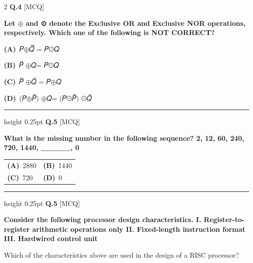 \documentclass[a4paper,10pt,twoside]{article}
\begin{document}
\begin{multicols}{2}
\noindent\textbf{Q.4} \hfill {\footnotesize\textsf{[MCQ]}}
\par\vspace{2pt}
{\bfseries Let $\oplus$ and ⊙ denote the Exclusive OR and Exclusive NOR operations, respectively.
Which one of the following is NOT CORRECT? \par}
\par\vspace{2pt}\noindent
\textbf{(A)}~𝑃$\oplus$𝑄̅̅̅̅̅̅̅̅ = 𝑃⊙𝑄\par\vspace{2pt}\noindent
\textbf{(B)}~𝑃̅ $\oplus$𝑄= 𝑃⊙𝑄\par\vspace{2pt}\noindent
\textbf{(C)}~𝑃̅ $\oplus$𝑄̅ = 𝑃$\oplus$𝑄\par\vspace{2pt}\noindent
\textbf{(D)}~(𝑃$\oplus$𝑃̅) $\oplus$𝑄= (𝑃⊙𝑃̅) ⊙𝑄̅
\par\vspace{6pt}\hrule height 0.25pt\vspace{6pt}
\noindent\textbf{Q.5} \hfill {\footnotesize\textsf{[MCQ]}}
\par\vspace{2pt}
{\bfseries What is the missing number in the following sequence?
2, 12, 60, 240, 720, 1440, \_\_\_\_\_, 0 \par}
\par\vspace{2pt}\noindent
\begin{tabular*}{\columnwidth}{@{\extracolsep{\fill}}p{}p{}@{}}
\textbf{(A)}~2880 & \textbf{(B)}~1440 \\
\addlinespace[2pt]
\textbf{(C)}~720 & \textbf{(D)}~0
\end{tabular*}
\par\vspace{6pt}\hrule height 0.25pt\vspace{6pt}
\noindent\textbf{Q.5} \hfill {\footnotesize\textsf{[MCQ]}}
\par\vspace{2pt}
{\bfseries Consider the following processor design characteristics.
I.
Register-to-register arithmetic operations only
II.
Fixed-length instruction format
III.
Hardwired control unit
\par\smallskip
Which of the characteristics above are used in the design of a RISC processor? \par}
\par\vspace{2pt}\noindent

\end{multicols}
\end{document}
